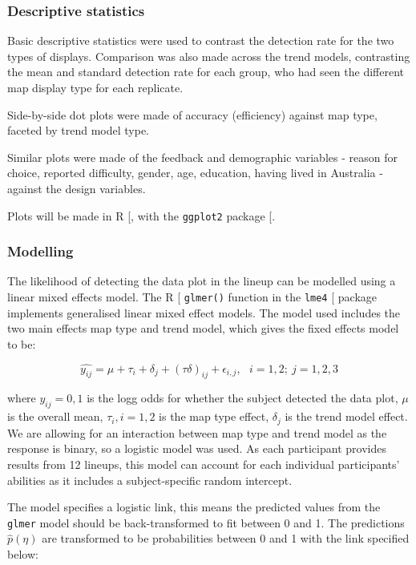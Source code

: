 \documentclass[
]{article}
\begin{document}
\subsubsection{Descriptive statistics}\label{descriptive-statistics}

Basic descriptive statistics were used to contrast the detection rate
for the two types of displays. Comparison was also made across the trend
models, contrasting the mean and standard detection rate for each group,
who had seen the different map display type for each replicate.

Side-by-side dot plots were made of accuracy (efficiency) against map
type, faceted by trend model type.

Similar plots were made of the feedback and demographic variables -
reason for choice, reported difficulty, gender, age, education, having
lived in Australia - against the design variables.

Plots will be made in R {[}\citeproc{ref-RCore}{18}{]}, with the
\texttt{ggplot2} package {[}\citeproc{ref-ggplot2}{14}{]}.

\subsubsection{Modelling}\label{modelling}

The likelihood of detecting the data plot in the lineup can be modelled
using a linear mixed effects model. The R {[}\citeproc{ref-RCore}{18}{]}
\texttt{glmer()} function in the \texttt{lme4}
{[}\citeproc{ref-lme4}{19}{]} package implements generalised linear
mixed effect models. The model used includes the two main effects map
type and trend model, which gives the fixed effects model to be:

\[\widehat{y_{ij}} = \mu + \tau_i + \delta_j + (\tau\delta)_{ij} + \epsilon_{i,j}, ~~~ i=1,2; ~j=1,2,3\]

where \(y_{ij} = 0, 1\) is the logg odds for whether the subject
detected the data plot, \(\mu\) is the overall mean, \(\tau_i, i=1,2\)
is the map type effect, \(\delta_j\) is the trend model effect. We are
allowing for an interaction between map type and trend model as the
response is binary, so a logistic model was used. As each participant
provides results from 12 lineups, this model can account for each
individual participants' abilities as it includes a subject-specific
random intercept.

The model specifies a logistic link, this means the predicted values
from the \texttt{glmer} model should be back-transformed to fit between
0 and 1. The predictions \(\widehat{p}(\eta)\) are transformed to be
probabilities between 0 and 1 with the link specified below:
\end{document}
